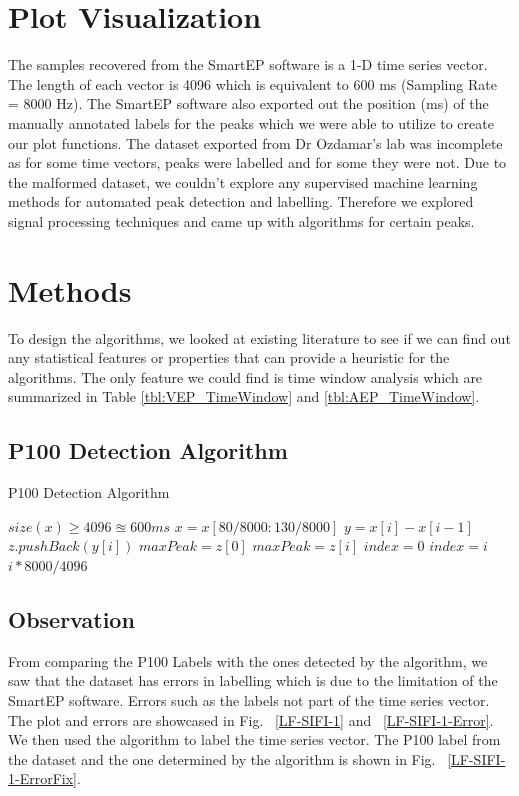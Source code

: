 \documentclass{article}
\begin{document}
	\section{Plot Visualization}
	The samples recovered from the SmartEP software is a 1-D time series vector. The length of each vector is 4096 which is equivalent to 600 ms (Sampling Rate = 8000 Hz). The SmartEP software also exported out the position (ms) of the manually annotated labels for the peaks which we were able to utilize to create our plot functions. The dataset exported from Dr Ozdamar's lab was incomplete as for some time vectors, peaks were labelled and for some they were not. Due to the malformed dataset, we couldn't explore any supervised machine learning methods for automated peak detection and labelling. Therefore we explored signal processing techniques and came up with algorithms for certain peaks.
	\section{Methods}
	To design the algorithms, we looked at existing literature to see if we can find out any statistical features or properties that can provide a heuristic for the algorithms. The only feature we could find is time window analysis which are summarized in Table \ref{tbl:VEP_TimeWindow} and \ref{tbl:AEP_TimeWindow}.
	
	\subsection{P100 Detection Algorithm}
	\begin{algorithm}
		\caption{P100 Detection Algorithm}\label{alg:P100Algorithm}
		\begin{algorithmic}
			\Require $size(x) \geq 4096 \approxeq 600ms$
			\State $x = x[80/8000 : 130/8000]$
				\State $y = x[i] - x[i-1]$			
			\EndFor
					\State $z.pushBack(y[i])$
				\EndIf
			\EndFor
			\State $maxPeak = z[0]$
					\State $maxPeak = z[i]$
				\EndIf
			\EndFor
			\State $index = 0$
					\State $index = i$
				\EndIf
			\EndFor
			\\
			\Return $i*8000/4096$
			
		\end{algorithmic}
	\end{algorithm}
	
	
	\subsection{Observation}
	From comparing the P100 Labels with the ones detected by the algorithm, we saw that the dataset has errors in labelling which is due to the limitation of the SmartEP software. Errors such as the labels not part of the time series vector.
	The plot and errors are showcased in Fig. ~\ref{LF-SIFI-1} and ~\ref{LF-SIFI-1-Error}. We then used the algorithm to label the time series vector. The P100 label from the dataset and the one determined by the algorithm is shown in Fig. ~\ref{LF-SIFI-1-ErrorFix}.
	
\end{document}
